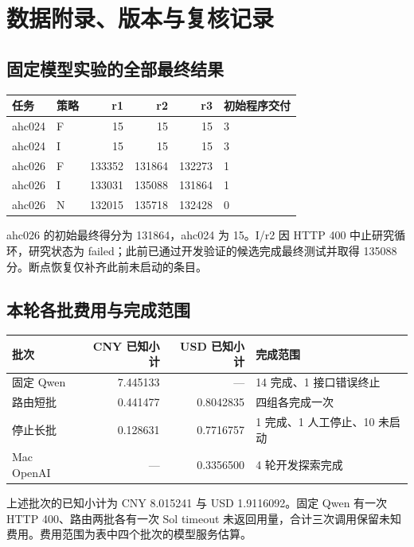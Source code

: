 \section{数据附录、版本与复核记录}\label{sec:appendix}
\subsection{固定模型实验的全部最终结果}
\begin{smalltable}
\begin{tabularx}{\linewidth}{@{}llrrrL@{}}\toprule
任务 & 策略 & r1 & r2 & r3 & 初始程序交付\\\midrule
ahc024 & F & 15 & 15 & 15 & 3\\
ahc024 & I & 15 & 15 & 15 & 3\\
ahc026 & F & 133352 & 131864 & 132273 & 1\\
ahc026 & I & 133031 & 135088 & 131864 & 1\\
ahc026 & N & 132015 & 135718 & 132428 & 0\\\bottomrule
\end{tabularx}
\end{smalltable}
ahc026 的初始最终得分为 131864，ahc024 为 15。I/r2 因 HTTP 400 中止研究循环，研究状态为 failed；此前已通过开发验证的候选完成最终测试并取得 135088 分。断点恢复仅补齐此前未启动的条目。

\subsection{本轮各批费用与完成范围}
\begin{smalltable}
\begin{tabularx}{\linewidth}{@{}LrrL@{}}\toprule
批次 & CNY 已知小计 & USD 已知小计 & 完成范围\\\midrule
固定 Qwen & 7.445133 & --- & 14 完成、1 接口错误终止\\
路由短批 & 0.441477 & 0.8042835 & 四组各完成一次\\
停止长批 & 0.128631 & 0.7716757 & 1 完成、1 人工停止、10 未启动\\
Mac OpenAI & --- & 0.3356500 & 4 轮开发探索完成\\\bottomrule
\end{tabularx}
\end{smalltable}

上述批次的已知小计为 CNY 8.015241 与 USD 1.9116092。固定 Qwen 有一次 HTTP 400、路由两批各有一次 Sol timeout 未返回用量，合计三次调用保留未知费用。费用范围为表中四个批次的模型服务估算。

